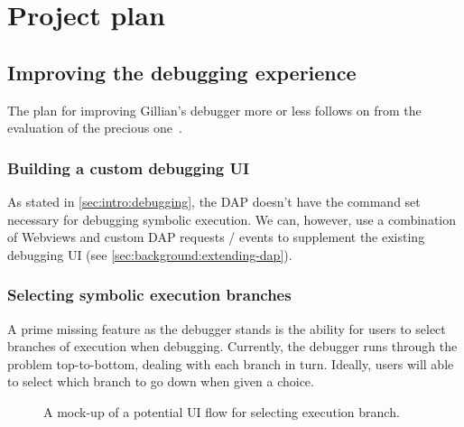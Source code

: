 \chapter{Project plan}
\label{cha:plan}

\section{Improving the debugging experience}

The plan for improving Gillian's debugger more or less follows on from the evaluation of the precious one~\cite{gillian-debugging-2021}.

\subsection{Building a custom debugging UI}

As stated in \autoref{sec:intro:debugging}, the DAP doesn't have the command
set necessary for debugging symbolic execution. We can, however, use a
combination of Webviews and custom DAP requests / events to supplement the
existing debugging UI (see \autoref{sec:background:extending-dap}).

\subsection{Selecting symbolic execution branches}

A prime missing feature as the debugger stands is the ability for users to
select branches of execution when debugging. Currently, the debugger runs
through the problem top-to-bottom, dealing with each branch in turn. Ideally,
users will able to select which branch to go down when given a choice.

\begin{figure}
  \noindent
  \caption{A mock-up of a potential UI flow for selecting execution branch.}
  \label{fig:branch-selection-mockup}
\end{figure}

